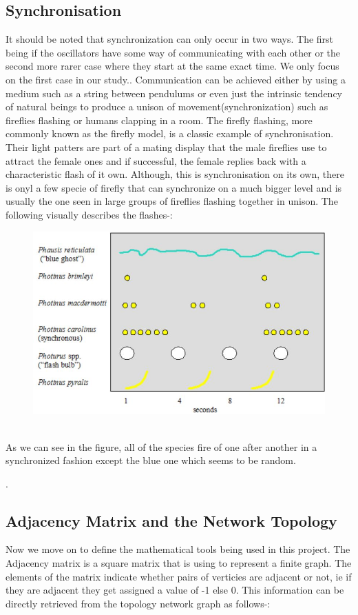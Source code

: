 \subsection{Synchronisation}
It should be noted that synchronization can only occur in two ways. The first being if the oscillators have some way of communicating with each other or the second more rarer case where they start at the same exact time. We only focus on the first case in our study.. Communication can be achieved either by using a medium such as a string between pendulums or even just the intrinsic tendency of natural beings to produce a unison of movement(synchronization) such as fireflies flashing or humans clapping in a room. The firefly flashing, more commonly known as the firefly model, is a classic example of synchronisation. Their light patters are part of a mating display that the male fireflies use to attract the female ones and if successful, the female replies back with a characteristic flash of it own. Although, this is synchronisation on its own, there is onyl a few specie of firefly that can synchronize on a much bigger level and is usually the one seen in large groups of fireflies flashing together in unison. The following visually describes the flashes-:
\begin{figure}[h!]
	\centering
	\includegraphics[width=0.5\linewidth]{imgs/flash}
	\caption{}
	\label{fig:intro_couple}
\end{figure}
\\

As we can see in the figure, all of the species fire of one after another in a synchronized fashion except the blue one which seems to be random.


.

\subsection{Adjacency Matrix and the Network Topology }
Now we move on to define the mathematical tools being used in this project. The Adjacency matrix is a square matrix that is using to represent a finite graph. The elements of the matrix indicate whether pairs of verticies are adjacent or not, ie if they are adjacent they get assigned a value of -1 else 0. This information can be directly retrieved from the topology network graph as follows-:

